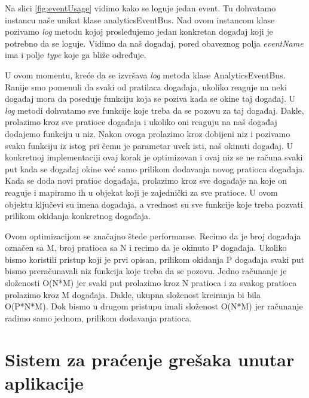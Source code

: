 \documentclass[12pt,oneside]{memoir}
\begin{document}
Na slici \ref{fig:eventUsage} vidimo kako se loguje jedan event. Tu dohvatamo instancu naše unikat klase analyticsEventBus. Nad ovom instancom klase pozivamo \textit{log} metodu kojoj prosleđujemo jedan konkretan događaj koji je potrebno da se loguje. Vidimo da naš događaj, pored obaveznog polja \textit{eventName} ima i polje \textit{type} koje ga bliže određuje. \newline

U ovom momentu, kreće da se izvršava \textit{log} metoda klase AnalyticsEventBus. Ranije smo pomenuli da svaki od pratilaca događaja, ukoliko reaguje na neki događaj mora da poseduje funkciju koja se poziva kada se okine taj događaj. U \textit{log} metodi dohvatamo sve funkcije koje treba da se pozovu za taj događaj. Dakle, prolazimo kroz sve pratioce događaja i ukoliko oni reaguju na naš događaj dodajemo funkciju u niz. Nakon ovoga prolazimo kroz dobijeni niz i pozivamo svaku funkciju iz istog pri čemu je parametar uvek isti, naš okinuti događaj. U konkretnoj implementaciji ovaj korak je optimizovan i ovaj niz se ne računa svaki put kada se događaj okine već samo prilikom dodavanja novog pratioca događaja. Kada se doda novi pratioc događaja, prolazimo kroz sve događaje na koje on reaguje i mapiramo ih u objekat koji je zajednički za sve pratioce. U ovom objektu ključevi su imena događaja, a vrednost su sve funkcije koje treba pozvati prilikom okidanja konkretnog događaja. \newline

Ovom optimizacijom se značajno štede performanse. Recimo da je broj događaja označen sa M, broj pratioca sa N i recimo da je okinuto P događaja. Ukoliko bismo koristili pristup koji je prvi opisan, prilikom okidanja P događaja svaki put bismo preračunavali niz funkcija koje treba da se pozovu. Jedno računanje je složenosti O(N*M) jer svaki put prolazimo kroz N pratioca i za svakog pratioca prolazimo kroz M događaja. Dakle, ukupna složenost kreiranja bi bila O(P*N*M)\cite{BigONotation}. Dok bismo u drugom pristupu imali složenost O(N*M) jer računanje radimo samo jednom, prilikom dodavanja pratioca.

\chapter{Sistem za praćenje grešaka unutar aplikacije}
\end{document}
